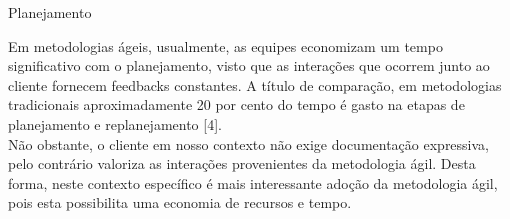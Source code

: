 {
	\large{Planejamento\\}

	\tab Em metodologias ágeis, usualmente, as equipes economizam um tempo significativo com o planejamento, visto que as interações que ocorrem junto ao cliente fornecem feedbacks constantes. A título de comparação, em metodologias tradicionais aproximadamente 20 por cento do tempo é gasto na etapas de planejamento e replanejamento [4]. \\
	\tab Não obstante, o cliente em nosso contexto não exige documentação expressiva, pelo contrário valoriza as interações provenientes da metodologia ágil. Desta forma, neste contexto  específico é mais interessante adoção da metodologia ágil,  pois esta  possibilita uma economia de recursos e tempo. \\

}

